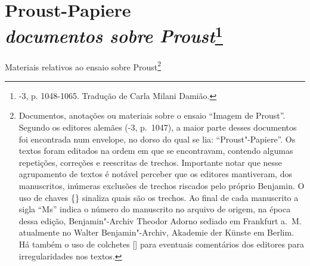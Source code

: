 
\chapter*{Proust-Papiere\\ \emph{documentos sobre Proust}\footnote[*]{-3, p. 1048-1065. Tradução de Carla Milani Damião.}}

\begin{center}
Materiais relativos ao ensaio sobre Proust\footnote{Documentos, anotações ou materiais sobre o ensaio ``Imagem de Proust''. Segundo os editores alemães (-3, p.~1047), a maior parte desses documentos foi encontrada num envelope, no dorso do qual se lia: ``Proust"-Papiere''. Os textos foram editados na ordem em que se encontravam, contendo algumas repetições, correções e reescritas de trechos. Importante notar que nesse agrupamento de textos é notável perceber que os editores mantiveram, dos manuscritos, inúmeras exclusões de trechos riscados pelo próprio Benjamin. O uso de chaves \{\} sinaliza quais são os trechos. Ao final de cada manuscrito a sigla ``Ms'' indica o número do manuscrito no arquivo de origem, na época dessa edição, Benjamin"-Archiv Theodor Adorno sediado em Frankfurt a.~M. atualmente no Walter Benjamin"-Archiv, Akademie der Künste em Berlim. Há também o uso de colchetes [] para eventuais comentários dos editores para irregularidades nos textos.}
\end{center}



